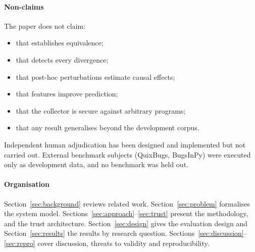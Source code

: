 \paragraph*{Non-claims} The paper does not claim:
\begin{itemize}
\item that \NDO{} establishes equivalence;
\item that \sbg{} detects every divergence;
\item that post-hoc perturbations estimate causal effects;
\item that \ers{} features improve prediction;
\item that the collector is secure against arbitrary programs;
\item that any result generalises beyond the development corpus.
\end{itemize}
Independent human adjudication has been designed and implemented but not carried out. External benchmark subjects (QuixBugs, BugsInPy) were executed only as development data, and no benchmark was held out.

\paragraph*{Organisation} Section~\ref{sec:background} reviews related work. Section~\ref{sec:problem} formalises the system model. Sections~\ref{sec:approach}--\ref{sec:trust} present the methodology, \ers{} and the trust architecture. Section~\ref{sec:design} gives the evaluation design and Section~\ref{sec:results} the results by research question. Sections~\ref{sec:discussion}--\ref{sec:repro} cover discussion, threats to validity and reproducibility.
